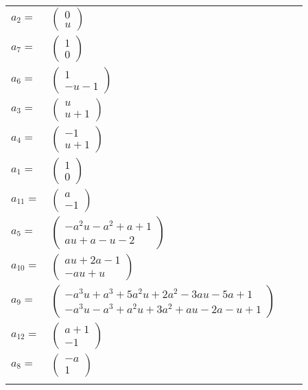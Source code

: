 \documentclass[1p]{elsarticle_modified}
\theoremstyle{definition}
\begin{document}
\begin{tabular}{m{7pt} m{180pt} m{7pt} m{180pt} }
\flushright $a_{2}=$&$\begin{pmatrix}0\\u\end{pmatrix}$ \\
\flushright $a_{7}=$&$\begin{pmatrix}1\\0\end{pmatrix}$ \\
\flushright $a_{6}=$&$\begin{pmatrix}1\\- u-1\end{pmatrix}$ \\
\flushright $a_{3}=$&$\begin{pmatrix}u\\u+1\end{pmatrix}$ \\
\flushright $a_{4}=$&$\begin{pmatrix}-1\\u+1\end{pmatrix}$ \\
\flushright $a_{1}=$&$\begin{pmatrix}1\\0\end{pmatrix}$ \\
\flushright $a_{11}=$&$\begin{pmatrix}a\\-1\end{pmatrix}$ \\
\flushright $a_{5}=$&$\begin{pmatrix}- a^2 u- a^2+a+1\\a u+a- u-2\end{pmatrix}$ \\
\flushright $a_{10}=$&$\begin{pmatrix}a u+2 a-1\\- a u+u\end{pmatrix}$ \\
\flushright $a_{9}=$&$\begin{pmatrix}- a^3 u+a^3+5 a^2 u+2 a^2-3 a u-5 a+1\\- a^3 u- a^3+a^2 u+3 a^2+a u-2 a- u+1\end{pmatrix}$ \\
\flushright $a_{12}=$&$\begin{pmatrix}a+1\\-1\end{pmatrix}$ \\
\flushright $a_{8}=$&$\begin{pmatrix}- a\\1\end{pmatrix}$\\&\end{tabular}
\end{document}

